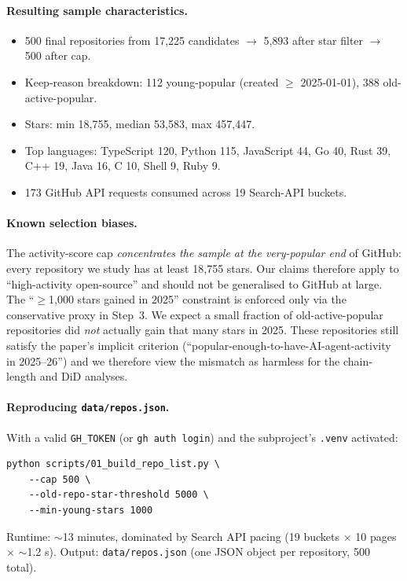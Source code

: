 \paragraph{Resulting sample characteristics.}
\begin{itemize}
\item 500 final repositories from 17{,}225 candidates $\to$ 5{,}893 after star filter $\to$ 500 after cap.
\item Keep-reason breakdown: 112 young-popular (created $\geq$ 2025-01-01), 388 old-active-popular.
\item Stars: min 18{,}755, median 53{,}583, max 457{,}447.
\item Top languages: TypeScript 120, Python 115, JavaScript 44, Go 40, Rust 39, C++ 19, Java 16, C 10, Shell 9, Ruby 9.
\item 173 GitHub API requests consumed across 19 Search-API buckets.
\end{itemize}

\paragraph{Known selection biases.} The activity-score cap \emph{concentrates the sample at the very-popular end} of GitHub: every repository we study has at least 18{,}755 stars. Our claims therefore apply to ``high-activity open-source'' and should not be generalised to GitHub at large. The ``$\geq$1{,}000 stars gained in 2025'' constraint is enforced only via the conservative proxy in Step~3. We expect a small fraction of old-active-popular repositories did \emph{not} actually gain that many stars in 2025. These repositories still satisfy the paper's implicit criterion (``popular-enough-to-have-AI-agent-activity in 2025--26'') and we therefore view the mismatch as harmless for the chain-length and DiD analyses.

\paragraph{Reproducing \texttt{data/repos.json}.} With a valid \texttt{GH\_TOKEN} (or \texttt{gh auth login}) and the subproject's \texttt{.venv} activated:
\begin{verbatim}
python scripts/01_build_repo_list.py \
    --cap 500 \
    --old-repo-star-threshold 5000 \
    --min-young-stars 1000
\end{verbatim}
Runtime: $\sim$13 minutes, dominated by Search API pacing (19 buckets $\times$ 10 pages $\times$ $\sim$1.2 s). Output: \texttt{data/repos.json} (one JSON object per repository, 500 total).

